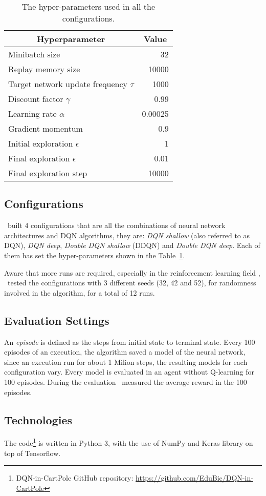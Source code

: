 \begin{table}
	\centering
	\begin{tabular}{|l|r|}
		\hline
		\multicolumn{1}{|c|}{\textbf{Hyperparameter}} &
		\multicolumn{1}{|c|}{\textbf{Value}}        \\
		\hline
		Minibatch size & 32 \\
		Replay memory size & 10000 \\
		Target network update frequency $\tau$ & 1000 \\
		Discount factor $\gamma$ & 0.99 \\
		Learning rate $\alpha$ & 0.00025 \\
		Gradient momentum & 0.9 \\
		Initial exploration $\epsilon$ & 1 \\
		Final exploration $\epsilon$ & 0.01 \\
		Final exploration step & 10000 \\
		\hline
	\end{tabular}
	
	\caption{The hyper-parameters used in all the configurations.}
	\label{tab:my-hyperparams}
\end{table}

\subsection{Configurations}

\Auth~built 4 configurations that are all the combinations of neural network architectures and DQN algorithms, they are: \textit{DQN shallow} (also referred to as DQN), \textit{DQN deep}, \textit{Double DQN shallow} (DDQN) and \textit{Double DQN deep}. Each of them has set the hyper-parameters shown in the Table~\ref{tab:my-hyperparams}.

Aware that more runs are required, especially in the reinforcement learning field \cite{DBLP:journals/corr/abs-1709-06560}, \auth~tested the configurations with 3 different seeds (32, 42 and 52), for randomness involved in the algorithm, for a total of 12 runs.


\subsection{Evaluation Settings}

An \textit{episode} is defined as the steps from initial state to terminal state. Every 100 episodes of an execution, the algorithm saved a model of the neural network, since an execution run for about 1 Milion steps, the resulting models for each configuration vary. Every model is evaluated in an agent without Q-learning for 100 episodes. During the evaluation \auth~measured the average reward in the 100 episodes.

\subsection{Technologies}
The code\footnote{DQN-in-CartPole GitHub repository: \url{https://github.com/EduBic/DQN-in-CartPole}} is written in Python 3, with the use of NumPy and Keras library on top of Tensorflow.





